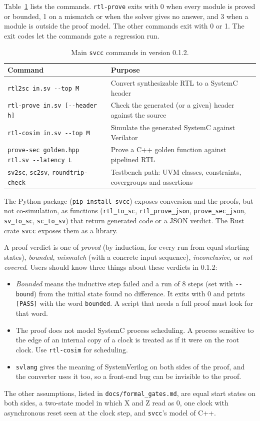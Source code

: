 \documentclass[preprint,12pt]{elsarticle}
\newcommand{\code}[1]{\texttt{#1}}
\begin{document}
Table~\ref{tab:cli} lists the commands. \code{rtl-prove} exits with 0 when every module is proved
or bounded, 1 on a mismatch or when the solver gives no answer, and 3 when a module is outside the
proof model. The other commands exit with 0 or 1. The exit codes let the commands gate a regression
run.

\begin{table}[t]
\centering\small
\caption{Main \code{svcc} commands in version 0.1.2.}
\label{tab:cli}
\begin{tabularx}{\textwidth}{@{}l >{\raggedright\arraybackslash}X@{}}
\toprule
Command & Purpose \\
\midrule
\code{rtl2sc in.sv -{}-top M} & Convert synthesizable RTL to a SystemC header \\
\code{rtl-prove in.sv [-{}-header h]} & Check the generated (or a given) header against the source \\
\code{rtl-cosim in.sv -{}-top M} & Simulate the generated SystemC against Verilator \\
\code{prove-sec golden.hpp rtl.sv -{}-latency L} & Prove a C++ golden function against pipelined RTL \\
\code{sv2sc}, \code{sc2sv}, \code{roundtrip-check} & Testbench path: UVM classes, constraints, covergroups and assertions \\
\bottomrule
\end{tabularx}
\end{table}

The Python package (\code{pip install svcc}) exposes conversion and the proofs, but not
co-simulation, as functions
(\code{rtl\_to\_sc}, \code{rtl\_prove\_json}, \code{prove\_sec\_json}, \code{sv\_to\_sc},
\code{sc\_to\_sv}) that return generated code or a JSON verdict. The Rust crate \code{svcc} exposes
them as a library.

A proof verdict is one of \emph{proved} (by induction, for every run from equal starting states),
\emph{bounded}, \emph{mismatch} (with a concrete input sequence), \emph{inconclusive}, or \emph{not
covered}. Users should know three things about these verdicts in 0.1.2:
\begin{itemize}
\item \emph{Bounded} means the inductive step failed and a run of 8 steps (set with
\code{-{}-bound}) from the initial state found no difference. It exits with 0 and prints \code{[PASS]} with the word \code{bounded}. A script that
needs a full proof must look for that word.
\item The proof does not model SystemC process scheduling. A process sensitive to the edge of an
internal copy of a clock is treated as if it were on the root clock. Use \code{rtl-cosim} for
scheduling.
\item \code{svlang} gives the meaning of SystemVerilog on both sides of the proof, and the converter
uses it too, so a front-end bug can be invisible to the proof.
\end{itemize}
The other assumptions, listed in \code{docs/formal\_gates.md}, are equal start states on both sides,
a two-state model in which X and Z read as 0, one clock with asynchronous reset seen at the clock
step, and \code{svcc}'s model of C++.
\end{document}
